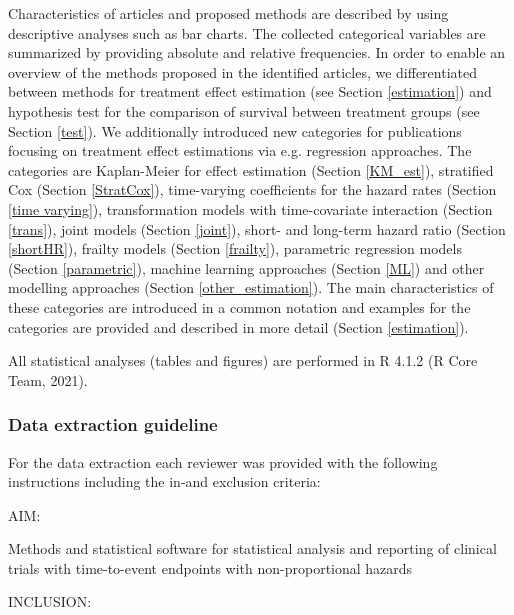 \noindent

\noindent Characteristics of articles and proposed methods are described by using descriptive analyses such as bar charts. The collected categorical variables are summarized by providing absolute and relative frequencies.
In order to enable an overview of the methods proposed in the identified articles, we differentiated between methods for treatment effect estimation (see Section \ref{estimation}) and hypothesis test for the comparison of survival between treatment groups (see Section \ref{test}). We additionally introduced new categories for publications focusing on treatment effect estimations via e.g. regression approaches. The categories are Kaplan-Meier for effect estimation (Section \ref{KM_est}), stratified Cox (Section \ref{StratCox}), time-varying coefficients for the hazard rates (Section \ref{time varying}), transformation models with time-covariate interaction (Section \ref{trans}), joint models (Section \ref{joint}), short- and long-term hazard ratio (Section \ref{shortHR}), frailty models (Section \ref{frailty}), parametric regression models (Section \ref{parametric}), machine learning approaches (Section \ref{ML}) and other modelling approaches (Section \ref{other_estimation}). The main characteristics of these categories are introduced in a common notation and examples for the categories are provided and described in more detail (Section \ref{estimation}).

\noindent All statistical analyses (tables and figures) are performed in R 4.1.2 (R Core Team, 2021).


\subsubsection{Data extraction guideline} \label{dataextraction}

\noindent

\noindent For the data extraction each reviewer was provided with the following instructions including the in-and exclusion criteria:

\noindent \textbf{}

\noindent 

\noindent AIM:

\noindent Methods and statistical software for statistical analysis and reporting of clinical trials with time-to-event endpoints with non-proportional hazards

\noindent 

\noindent INCLUSION:

